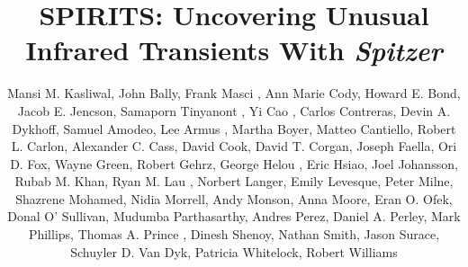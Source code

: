 \documentclass[twocolumn,times]{aastex6}
\begin{document}
\title{SPIRITS:  Uncovering Unusual Infrared Transients With {\it Spitzer}} %
\author{Mansi M. Kasliwal,
John Bally,
Frank Masci ,
Ann Marie Cody,
Howard E. Bond,
Jacob E. Jencson,
Samaporn Tinyanont ,
Yi Cao ,
Carlos Contreras,
Devin A. Dykhoff,
Samuel Amodeo,
Lee Armus ,
Martha Boyer,
Matteo Cantiello,
Robert L. Carlon,
Alexander C. Cass,
David Cook,
David T. Corgan,
Joseph Faella,
Ori D. Fox,
Wayne Green,
Robert Gehrz,
George Helou ,
Eric Hsiao,
Joel Johansson,
Rubab M. Khan,
Ryan M. Lau ,
Norbert Langer,
Emily Levesque,
Peter Milne,
Shazrene Mohamed,
Nidia Morrell,
Andy Monson,
Anna Moore, 
Eran O. Ofek,
Donal O' Sullivan,
Mudumba Parthasarthy,
Andres Perez,
Daniel A. Perley,
Mark Phillips,
Thomas A. Prince ,
Dinesh Shenoy,
Nathan Smith,
Jason Surace,
Schuyler D. Van Dyk,
Patricia Whitelock,
Robert Williams
}
\end{document}
